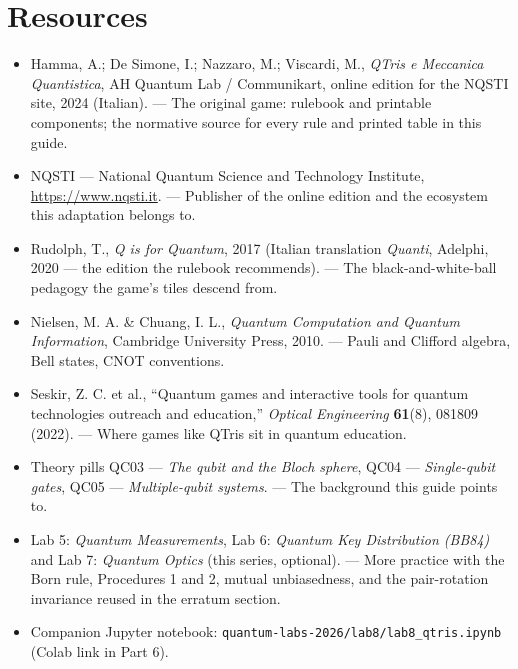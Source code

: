\documentclass[a4paper,11pt]{article}
\begin{document}
\section{Resources}

\begin{itemize}
    \item Hamma, A.; De Simone, I.; Nazzaro, M.; Viscardi, M., \textit{QTris e
          Meccanica Quantistica}, AH Quantum Lab / Communikart, online edition for the
          NQSTI site, 2024 (Italian). --- The original game: rulebook and printable
          components; the normative source for every rule and printed table in this
          guide.
    \item NQSTI --- National Quantum Science and Technology Institute,
          \url{https://www.nqsti.it}. --- Publisher of the online edition and the
          ecosystem this adaptation belongs to.
    \item Rudolph, T., \textit{Q is for Quantum}, 2017 (Italian translation
          \textit{Quanti}, Adelphi, 2020 --- the edition the rulebook recommends). ---
          The black-and-white-ball pedagogy the game's tiles descend from.
    \item Nielsen, M. A. \& Chuang, I. L., \textit{Quantum Computation and Quantum
          Information}, Cambridge University Press, 2010. --- Pauli and Clifford
          algebra, Bell states, CNOT conventions.
    \item Seskir, Z. C. et al., ``Quantum games and interactive tools for quantum
          technologies outreach and education,'' \textit{Optical Engineering}
          \textbf{61}(8), 081809 (2022). --- Where games like QTris sit in quantum
          education.
    \item Theory pills QC03 --- \textit{The qubit and the Bloch sphere}, QC04 ---
          \textit{Single-qubit gates}, QC05 --- \textit{Multiple-qubit systems}. --- The
          background this guide points to.
    \item Lab 5: \textit{Quantum Measurements}, Lab 6: \textit{Quantum Key Distribution
          (BB84)} and Lab 7: \textit{Quantum Optics} (this series, optional). --- More
          practice with the Born rule, Procedures 1 and 2, mutual unbiasedness, and the
          pair-rotation invariance reused in the erratum section.
    \item Companion Jupyter notebook:
          \texttt{quantum-labs-2026/lab8/lab8\_qtris.ipynb} (Colab link in Part 6).
\end{itemize}
\end{document}
